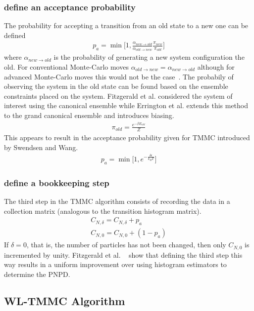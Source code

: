 \documentclass[letterpaper,twocolumn,amsmath,amssymb,pre,aps,10pt]{revtex4-1}
\begin{document}
\subsubsection{define an acceptance probability}
The probability for accepting a transition from an old state to a new one can be 
defined
\begin{align}
  p_{a} = \min\bigg[1,\frac{\alpha_{new\rightarrow old}}
  {\alpha_{old \rightarrow new}}\frac{\pi_{new}}{\pi_{old}}\bigg]
\end{align}
where $\alpha_{new\rightarrow old}$ is the probability of generating a 
new system configuration the old.  For conventional Monte-Carlo moves 
$\alpha_{old \rightarrow new} =\alpha_{new\rightarrow old}$ although 
for advanced Monte-Carlo moves this would not be the 
case~\cite{paluch2008comparing, siepmann1990method}.  The probabily of 
observing the system in the old state can be found based on the 
ensemble constraints placed on the system.  Fitzgerald et al. 
considered the system of interest using the canonical ensemble while 
Errington et al. extends this method to the grand canonical ensemble 
and introduces biasing.
\begin{align}
  \pi_{old} = \frac{e^{-\beta E_{old}}}{Z}
\end{align}
This appears to result in the acceptance probability given for TMMC introduced by 
Swendsen and Wang.
\begin{align}
  p_{a} = \min\bigg[1,e^{-\frac{\delta\epsilon}{k_{B} T}}\bigg]
\end{align}
\subsubsection{define a bookkeeping step}
The third step in the TMMC algorithm consists of recording the data in a collection 
matrix (analogous to the transition histogram matrix).
\begin{align}
  C_{N,\delta} = C_{N,\delta} + p_{a}\\
  C_{N,0} = C_{N,0} +(1 - p_{a})
\end{align}  
If $\delta=0$, that is, the number of particles has not been changed, then only 
$C_{N,0}$ is incremented by unity. Fitzgerald et al. ~\cite{fitzgerald2000monte}
show that defining the third step this way results in a uniform improvement over 
using histogram estimators to determine the PNPD.

\subsection{WL-TMMC Algorithm}
\end{document}

